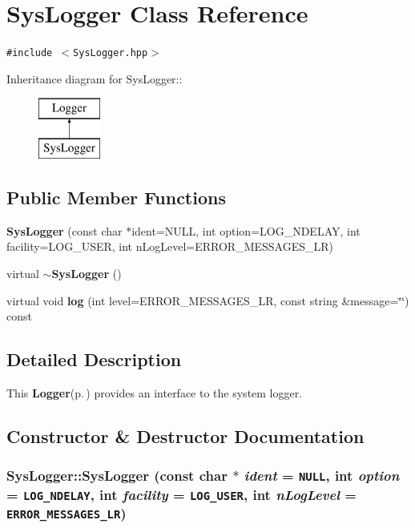 \section{Sys\-Logger Class Reference}
\label{classSysLogger}
{\tt \#include $<$Sys\-Logger.hpp$>$}

Inheritance diagram for Sys\-Logger::\begin{figure}[H]
\begin{center}
\leavevmode
\includegraphics[height=2cm]{classSysLogger}
\end{center}
\end{figure}
\subsection*{Public Member Functions}
\begin{CompactItemize}
\item 
{\bf Sys\-Logger} (const char $\ast$ident=NULL, int option=LOG\_\-NDELAY, int facility=LOG\_\-USER, int n\-Log\-Level=ERROR\_\-MESSAGES\_\-LR)
\item 
virtual {\bf $\sim$Sys\-Logger} ()
\item 
virtual void {\bf log} (int level=ERROR\_\-MESSAGES\_\-LR, const string \&message=\char`\"{}\char`\"{}) const 
\end{CompactItemize}


\subsection{Detailed Description}
This {\bf Logger}{\rm (p.\,\pageref{classLogger})} provides an interface to the system logger.



\subsection{Constructor \& Destructor Documentation}
\subsubsection{\setlength{\rightskip}{0pt plus 5cm}Sys\-Logger::Sys\-Logger (const char $\ast$ {\em ident} = {\tt NULL}, int {\em option} = {\tt LOG\_\-NDELAY}, int {\em facility} = {\tt LOG\_\-USER}, int {\em n\-Log\-Level} = {\tt ERROR\_\-MESSAGES\_\-LR})\hspace{0.3cm}{\tt  [inline]}}\label{classSysLogger_a0}


